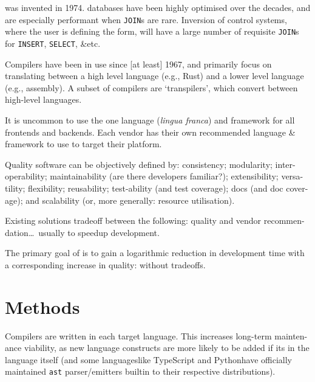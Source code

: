  was invented in 1974\cite{chamberlinSEQUELStructuredEnglish1974}.  databases have been highly optimised over the decades, and are especially performant when \texttt{JOIN}s are rare. Inversion of control systems, where the user is defining the form, will have a large number of requisite \texttt{JOIN}s for \texttt{INSERT}, \texttt{SELECT}, \&etc.

Compilers have been in use since [at least] 1967\cite{Mccarthy67correctnessof}, and primarily focus on translating between a high level language (e.g., Rust) and a lower level language (e.g., assembly). A subset of compilers are `transpilers', which convert between high-level languages.


It is uncommon to use the one language (\textit{lingua franca}) and framework for all frontends and backends. Each  vendor has their own recommended language \& framework to use to target their platform.

Quality software can be objectively defined by: consistency; modularity; inter-operability; maintainability (are there developers familiar?); extensibility; versa-\\tility; flexibility; reusability; test-ability (and test coverage); docs (and doc cover-\\age); and scalability (or, more generally: resource utilisation).

Existing solutions tradeoff between the following: quality and vendor recommen-\\dation\ldots~usually to speedup development.

The primary goal of  is to gain a logarithmic reduction in development time with a corresponding increase in quality: without tradeoffs.

\section{Methods}
Compilers are written in each target language. This increases long-term mainten-\\ance viability, as new language constructs are more likely to be added if its in the language itself (and some languages\textemdash{}like TypeScript and Python\textemdash{}have officially maintained \texttt{ast} parser/emitters builtin to their respective distributions).

